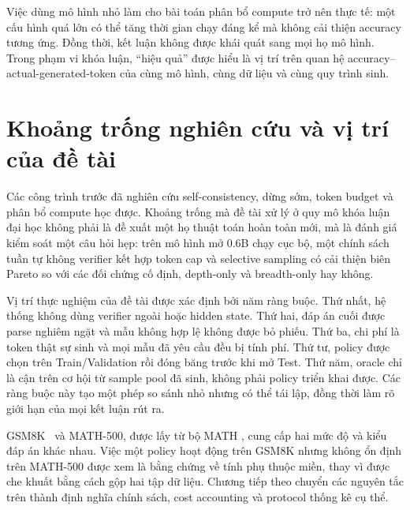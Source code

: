 Việc dùng mô hình nhỏ làm cho bài toán phân bổ compute trở nên thực tế: một cấu hình
quá lớn có thể tăng thời gian chạy đáng kể mà không cải thiện accuracy tương ứng.
Đồng thời, kết luận không được khái quát sang mọi họ mô hình. Trong phạm vi khóa luận,
``hiệu quả'' được hiểu là vị trí trên quan hệ accuracy--actual-generated-token của
cùng mô hình, cùng dữ liệu và cùng quy trình sinh.

\section{Khoảng trống nghiên cứu và vị trí của đề tài}

Các công trình trước đã nghiên cứu self-consistency, dừng sớm, token budget và phân bổ
compute học được. Khoảng trống mà đề tài xử lý ở quy mô khóa luận đại học không phải
là đề xuất một họ thuật toán hoàn toàn mới, mà là đánh giá kiểm soát một câu hỏi hẹp:
trên mô hình mở 0.6B chạy cục bộ, một chính sách tuần tự không verifier kết hợp token
cap và selective sampling có cải thiện biên Pareto so với các đối chứng cố định,
depth-only và breadth-only hay không.

Vị trí thực nghiệm của đề tài được xác định bởi năm ràng buộc. Thứ nhất, hệ thống không
dùng verifier ngoài hoặc hidden state. Thứ hai, đáp án cuối được parse nghiêm ngặt và
mẫu không hợp lệ không được bỏ phiếu. Thứ ba, chi phí là token thật sự sinh và mọi mẫu
đã yêu cầu đều bị tính phí. Thứ tư, policy được chọn trên Train/Validation rồi đóng
băng trước khi mở Test. Thứ năm, oracle chỉ là cận trên cơ hội từ sample pool đã sinh,
không phải policy triển khai được. Các ràng buộc này tạo một phép so sánh nhỏ nhưng
có thể tái lập, đồng thời làm rõ giới hạn của mọi kết luận rút ra.

GSM8K~\cite{cobbe2021gsm8k} và MATH-500, được lấy từ bộ MATH
\cite{hendrycks2021math}, cung cấp hai mức độ và kiểu đáp án khác nhau. Việc một policy
hoạt động trên GSM8K nhưng không ổn định trên MATH-500 được xem là bằng chứng về tính
phụ thuộc miền, thay vì được che khuất bằng cách gộp hai tập dữ liệu. Chương tiếp theo
chuyển các nguyên tắc trên thành định nghĩa chính sách, cost accounting và protocol
thống kê cụ thể.
